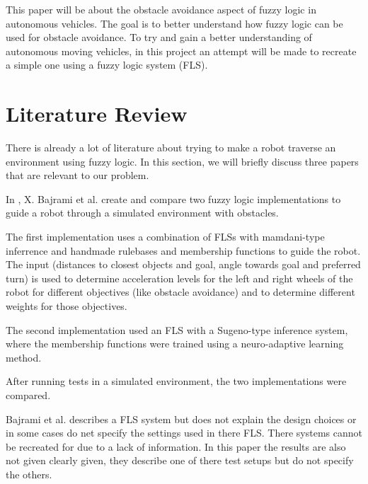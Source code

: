 \documentclass[conference]{IEEEtran}
\begin{document}
This paper will be about the obstacle avoidance aspect of fuzzy logic in autonomous vehicles. The goal is to better understand how fuzzy logic can be used for obstacle avoidance. To try and gain a better understanding of autonomous moving vehicles, in this project an attempt will be made to recreate a simple one using a fuzzy logic system (FLS).

\section{Literature Review}
There is already a lot of literature about trying to make a robot traverse an environment using fuzzy logic. In this section, we will briefly discuss three papers that are relevant to our problem.

In \cite{bajrami2015artificial}, X. Bajrami et al. create and compare two fuzzy logic implementations to guide a robot through a simulated environment with obstacles.

The first implementation uses a combination of FLSs with mamdani-type inferrence and handmade rulebases and membership functions to guide the robot. The input (distances to closest objects and goal, angle towards goal and preferred turn) is used to determine acceleration levels for the left and right wheels of the robot for different objectives (like obstacle avoidance) and to determine different weights for those objectives.

The second implementation used an FLS with a Sugeno-type inference system, where the membership functions were trained using a neuro-adaptive learning method.

After running tests in a simulated environment, the two implementations were compared.

Bajrami et al. \cite{bajrami2015artificial} describes a FLS system but does not explain the design choices or in some cases do net specify the settings used in there FLS. There systems cannot be recreated for due to a lack of information. In this paper the results are also not given clearly given, they describe one of there test setups but do not specify the others.
\end{document}

